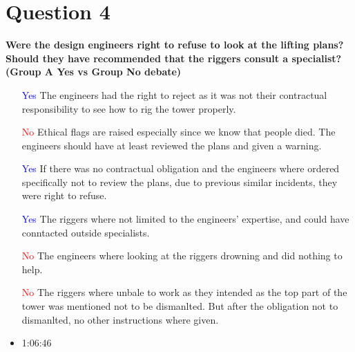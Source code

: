 \documentclass[12pt]{article}
\begin{document}
\section{Question 4}
\textbf{Were the design engineers right to refuse to look at the lifting plans? Should they have recommended that the riggers consult a specialist?  (Group A Yes vs Group No debate)}

\begin{itemize}
    \item [\textcolor{blue}{Yes}] The engineers had the right to reject as it was not their contractual responsibility to see how to rig the tower properly.
    \item [\textcolor{red}{No}] Ethical flags are raised especially since we know that people died. The engineers should have at least reviewed the plans and given a warning.
    \item [\textcolor{blue}{Yes}] If there was no contractual obligation and the engineers where ordered specifically not to review the plans, due to previous similar incidents, they were right to refuse.
    \item [\textcolor{blue}{Yes}] The riggers where not limited to the engineers' expertise, and could have conntacted outside specialists.
    \item [\textcolor{red}{No}] The engineers where looking at the riggers drowning and did nothing to help.
    \item [\textcolor{red}{No}] The riggers where unbale to work as they intended as the top part of the tower was mentioned not to be dismanlted. But after the obligation not to dismanlted, no other instructions where given.
    \item  1:06:46
\end{itemize}
\end{document}
